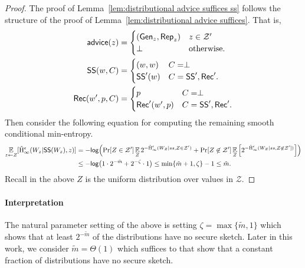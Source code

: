\begin{proof}
The proof of Lemma~\ref{lem:distributional advice suffices ss} follows the structure of the proof of Lemma~\ref{lem:distributional advice suffices}. That is, 
\begin{align*}
{\ensuremath{\mathsf{advice}}}(z) &= \begin{cases} ({\mathsf{Gen}}_z, {\mathsf{Rep}}_z)& z\in \mathcal{Z}'\\\perp&\text{otherwise.}\end{cases}\\
{\mathsf{SS}}(w, C) &= \begin{cases} (w, w) & C = \perp\\
{\mathsf{SS}}'(w) & C = {\mathsf{SS}}', {\mathsf{Rec}}'.\end{cases}\\
{\mathsf{Rec}}(w', p, C) &= \begin{cases} p & C = \perp\\
{\mathsf{Rec}}'(w',p) & C = {\mathsf{SS}}', {\mathsf{Rec}}'.\end{cases}\\
\end{align*}
Then consider the following equation for computing the remaining smooth conditional min-entropy.
\begin{align*}
\operatorname*{\mathbb{E}}_{z\leftarrow Z} [\tilde{\mathrm{H}}_\infty^\epsilon(W_z| {\mathsf{SS}}(W_z), z)] &= -\mathsf{log}\!\left(\Pr[Z\in \mathcal{Z}']\operatorname*{\mathbb{E}}_{Z} 2^{-\tilde{\mathrm{H}}_\infty^\epsilon(W_Z| ss, Z\in \mathcal{Z}')}+ \Pr[Z\not\in \mathcal{Z}']\operatorname*{\mathbb{E}}_{Z}\left[ 2^{-\tilde{\mathrm{H}}_\infty^\epsilon(W_Z| ss, Z\not\in \mathcal{Z}'] )}\right]\right)\\
&\le -\mathsf{log}\!\left(1 \cdot 2^{-\tilde{m}}+ 2^{-\zeta}\cdot 1\right) \le \min\{\tilde{m}+1,\zeta\}-1\le \tilde{m}.
\end{align*}
Recall in the above $Z$ is the uniform distribution over values in $\mathcal{Z}$.
\end{proof}

\paragraph{Interpretation}
The natural parameter setting of the above is setting $\zeta = \max\{\tilde{m},1\} $ which shows that at least $2^{-\tilde{m}}$ of the distributions have no secure sketch.  Later in this work, we consider $\tilde{m} = \Theta(1)$ which suffices to that show that a constant fraction of distributions have no secure sketch.



